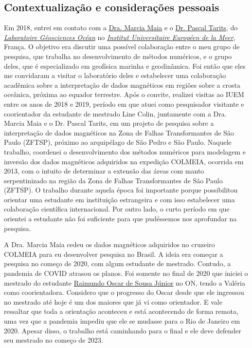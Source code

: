 \subsection*{Contextualização e considerações pessoais}

Em 2018, entrei em contato com a 
\href{https://www-iuem.univ-brest.fr/lgo/equipe/maia-marcia-do-carmo/}{Dra. Marcia Maia} 
e o 
\href{https://www-iuem.univ-brest.fr/lgo/equipe/tarits-pascal/}{Dr. Pascal Tarits},
do 
\href{https://www-iuem.univ-brest.fr/lgo/le-labo/}{\textit{Laboratoire Géosciences Océan}} 
no \href{https://www-iuem.univ-brest.fr/}{\textit{Institut Universitaire Européen de la Meer}}, França. O objetivo era discutir uma possível colaboração entre o meu grupo de 
pesquisa, que trabalha no desenvolvimento de métodos numéricos, e o grupo deles,
que é especializado em geofísica marinha e geodinâmica.
Foi então que eles me convidaram a visitar o laboratório deles e estabelecer uma colaboração
acadêmica sobre a interpretação de dados magnéticos em regiões sobre a crosta oceânica,
próxima ao equador terrestre. Após o convite, realizei visitas ao IUEM entre os anos de
2018 e 2019, período em que atuei como pesquisador visitante e 
coorientador da estudante de mestrado Line Colin, juntamente
com a Dra. Marcia Maia e o Dr. Pascal Tarits, em um projeto de pesquisa sobre a 
interpretação de dados magnéticos na Zona de Falhas Transformantes de São
Paulo (ZFTSP), próximo ao arquipélago de São Pedro e São Paulo.
Naquele trabalho, coordenei o desenvolvimento dos métodos numéricos para modelagem
e inversão dos dados magnéticos adquiridos na expedição
COLMEIA, ocorrida em 2013, com o intuito de determinar a extensão das áreas com manto 
serpentinizado na região da Zona de Falhas Transformantes de São Paulo (ZFTSP). 
O trabalho durante aquela época foi importante porque possibilitou orientar uma
estudante em instituição estrangeira e com isso estabelecer uma colaboração científica
internacional. Por outro lado, o curto período em que orientei a estudante não foi
suficiente para que pudéssemos nos aprofundar na pesquisa. 

\bigskip

\noindent A Dra. Marcia Maia cedeu os dados magnéticos adquiridos no cruzeiro COLMEIA
para eu desenvolver pesquisa no Brasil. A ideia era começar a pesquisa no começo
de 2020, com algum estudante de mestrado. Contudo, a pandemia de COVID atrasou os planos.
Foi somente no final de 2020 que iniciei o mestrado do estudante
\href{https://lattes.cnpq.br/5355013713549584}{Raimundo Oscar de Sousa Júnior} no ON,
tendo a Valéria como coorientadora. Considero que o progresso do Oscar desde que 
ele ingressou no mestrado até hoje é um dos maiores que já vi como orientador.
E vale ressaltar que toda a orientação aconteceu e está acontecendo de forma remota,
uma vez que a pandemia impediu que ele se mudasse para o Rio de Janeiro em 2020.
Apesar disso, o trabalho está caminhando para o final e ele deve defender seu mestrado 
no começo de 2023.

